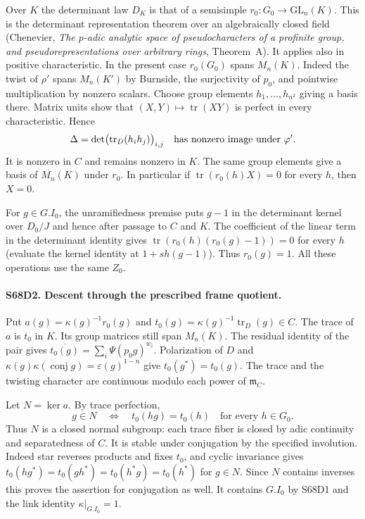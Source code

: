 Over $K$ the determinant law $D_K$ is that of a semisimple
$r_0:G_0\to\mathrm{GL}_n(K)$. This is the determinant
representation theorem over an algebraically closed field
(Chenevier, \emph{The $p$-adic analytic space of pseudocharacters
of a profinite group, and pseudorepresentations over arbitrary rings},
Theorem~A). It applies also in positive characteristic. In the
present case $r_0(G_0)$ spans $M_n(K)$. Indeed the twist of
$\rho'$ spans $M_n(K')$ by Burnside, the surjectivity of $p_0$,
and pointwise multiplication by nonzero scalars. Choose group
elements $h_1,\ldots,h_{n^2}$ giving a basis there. Matrix units
show that $(X,Y)\mapsto\operatorname{tr}(XY)$ is perfect in
every characteristic. Hence
\[
 \Delta=\det\bigl(\operatorname{tr}_{D}(h_i h_j)\bigr)_{i,j}
 \quad\hbox{has nonzero image under }\varphi'.
\]
It is nonzero in $C$ and remains nonzero in $K$. The same group
elements give a basis of $M_n(K)$ under $r_0$. In particular if
$\operatorname{tr}(r_0(h)X)=0$ for every $h$, then $X=0$.

For $g\in G.I_0$, the unramifiedness premise puts $g-1$ in
the determinant kernel over $D_0/J$ and hence after passage
to $C$ and $K$. The coefficient of the linear term in the
determinant identity gives
$\operatorname{tr}(r_0(h)(r_0(g)-1))=0$ for every $h$
(evaluate the kernel identity at $1+s h(g-1)$). Thus
$r_0(g)=1$. All these operations use the same $Z_0$.

\paragraph{S68D2. Descent through the prescribed frame quotient.}
Put $a(g)=\kappa(g)^{-1}r_0(g)$ and
$t_0(g)=\kappa(g)^{-1}\operatorname{tr}_{D}(g)\in C$.
The trace of $a$ is $t_0$ in $K$. Its group matrices still span
$M_n(K)$. The residual identity of the pair gives
$\overline{t_0(g)}=\sum_i\Psi(p_0g)^{w_i}$.
Polarization of $D$ and
$\kappa(g)\kappa(\operatorname{conj}g)=\varepsilon(g)^{1-n}$
give $t_0(g^*)=t_0(g)$. The trace and the twisting character
are continuous modulo each power of $\mathfrak m_C$.

Let $N=\ker a$. By trace perfection,
\[
 g\in N\quad\Longleftrightarrow\quad
 t_0(hg)=t_0(h)\quad\text{for every }h\in G_0.
\]
Thus $N$ is a closed normal subgroup: each trace fiber is closed
by adic continuity and separatedness of $C$. It is stable under
conjugation by the specified involution. Indeed star reverses
products and fixes $t_0$, and cyclic invariance gives
$t_0(hg^*)=t_0(g h^*)=t_0(h^*g)=t_0(h^*)$ for $g\in N$.
Since $N$ contains inverses this proves the assertion for
conjugation as well. It contains $G.I_0$ by S68D1 and the
link identity $\kappa|_{G.I_0}=1$.

